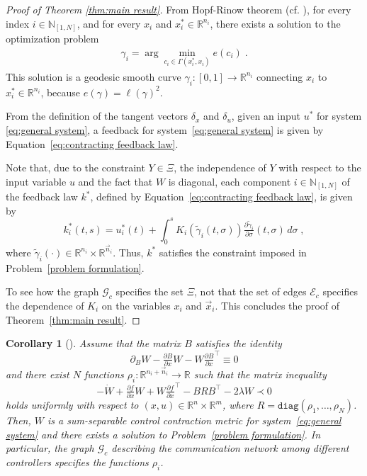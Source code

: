 \documentclass[10pt,twocolumn,twoside]{IEEEtran}
\newcounter{para}
\newcommand\mypara{\par}
\theoremstyle{plain}
\newtheorem{corollary}{Corollary}
\theoremstyle{definition}
\theoremstyle{remark}
\begin{document}
\begin{proof}[Proof of Theorem \ref{thm:main result}]
\mypara 	From Hopf-Rinow theorem (cf. \cite[Theorem 7.7]{Boothby1986}), for every index $i\in\mathbb{N}_{[1,N]}$, and for every $x_i$ and $x_i^\ast\in\mathbb{R}^{n_i}$, there exists a solution to the optimization problem
	\begin{align*}
		\gamma_i=\arg\min_{c_i\in\Gamma(x_i^\ast,x_i)} e(c_i)\;.
	\end{align*}
	This solution is a geodesic smooth curve $\gamma_i:[0,1]\to\mathbb{R}^{n_i}$ connecting $x_i$ to $x_i^\ast\in\mathbb{R}^{n_i}$, because $e(\gamma)=\ell(\gamma)^2$.
	
\mypara 	From the definition of the tangent vectors $\delta_x$ and $\delta_u$, given an input $u^\ast$ for system \eqref{eq:general system}, a feedback for system~\eqref{eq:general system} is given by Equation~\eqref{eq:contracting feedback law}. 

	
\mypara Note that, due to the constraint $Y\in\Xi$, the independence of $Y$ with respect to the input variable $u$ and the fact that $W$ is diagonal, each component $i\in\mathbb{N}_{[1,N]}$ of the feedback law $k^\ast$, defined by  Equation~\eqref{eq:contracting feedback law}, is given by
	\begin{equation*}
		k_i^\ast(t,s)=u_i^\ast(t)+\int_0^sK_i(\widetilde{\gamma}_i(t,\sigma))\tfrac{\partial\widetilde{\gamma}_i}{\partial \sigma}(t,\sigma)\,d\sigma\;,
	\end{equation*}
	where $\widetilde{\gamma}_i(\cdot)\in\mathbb{R}^{n_i}\times\mathbb{R}^{\vec{n}_i}$. Thus, $k^\ast$ satisfies the constraint imposed in Problem~\ref{problem formulation}. 
	
	\mypara To see how the graph $\mathscr{G}_c$ specifies the set $\Xi$, not that the set of edges $\mathscr{E}_c$ specifies the dependence of $K_i$ on the variables $x_i$ and $\vec{x}_i$. This concludes the proof of Theorem~\ref{thm:main result}.
\end{proof}

\begin{corollary}[{\cite{SteinShiromotoManchester2016}}]\label{cor:main result}
	Assume that the matrix $B$ satisfies the identity
	\begin{equation*}
		\partial_BW-\tfrac{\partial B}{\partial x}W-W\tfrac{\partial B}{\partial x}^\top\equiv0
	\end{equation*}
	and there exist $N$ functions $\rho_i:\mathbb{R}^{n_i+\vec{n}_i}\to\mathbb{R}$ such that the matrix inequality
	\begin{equation}\label{eq:with R}
		-\dot{W}+\tfrac{\partial f}{\partial x}W+W\tfrac{\partial f}{\partial x}^\top-BRB^\top-2\lambda W\prec0
	\end{equation}
	holds uniformly with respect to $(x,u)\in\mathbb{R}^n\times\mathbb{R}^m$, where $R=\mathbin{\mathtt{diag}}(\rho_1,\ldots,\rho_N)$. Then, $W$ is a sum-separable control contraction metric for system~\eqref{eq:general system} and there exists a solution to Problem~\ref{problem formulation}. In particular, the graph $\mathscr{G}_c$ describing the communication network among different controllers specifies the functions $\rho_i$.
\end{corollary}
\end{document}
